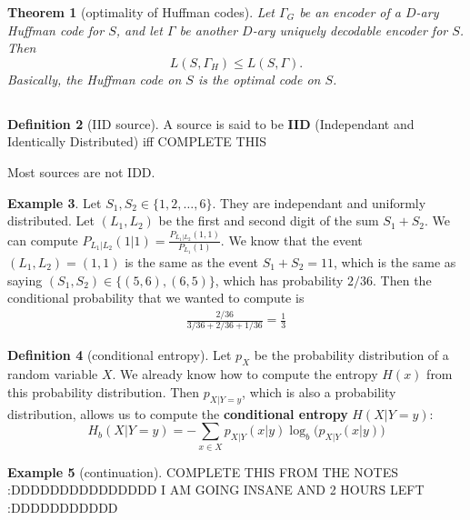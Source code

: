 \documentclass{report}
\theoremstyle{plain}
\newtheorem{thm}{Theorem}
\theoremstyle{definition}
\newtheorem{exmp}[thm]{Example}
\newtheorem{defn}[thm]{Definition}
\theoremstyle{remark}
\begin{document}
\begin{thm}[optimality of Huffman codes]
	Let $\Gamma_G$ be an encoder of a $D$-ary Huffman code for $S$, and let $\Gamma$ be another $D$-ary uniquely decodable encoder for $S$. Then
	\begin{equation}
		L(S, \Gamma_H) \leq L(S, \Gamma).
	\end{equation}
	Basically, the Huffman code on $S$ is the optimal code on $S$.
\end{thm}


\subsection{}

\begin{defn}[IID source]
	A source is said to be \textbf{IID} (Independant and Identically Distributed) iff COMPLETE THIS
\end{defn}
Most sources are not IDD.

\begin{exmp}
	Let $S_1, S_2 \in \{1, 2, \ldots, 6\}$. They are independant and uniformly distributed. Let $(L_1, L_2)$ be the first and second digit of the sum $S_1 + S_2$. We can compute $P_{L_1 | L_2} (1|1) = \frac{P_{L_1 | L_2}(1, 1)}{P_{L_1}(1)}$. We know that the event $(L_1, L_2) = (1, 1)$ is the same as the event $S_1 + S_2 = 11$, which is the same as saying $(S_1, S_2) \in \{(5, 6), (6, 5)\}$, which has probability $2/36$. Then the conditional probability that we wanted to compute is
	\begin{align*}
		\frac{2/36}{3/36 + 2/36 + 1/36} = \frac13
	\end{align*}
\end{exmp}

\begin{defn}[conditional entropy]
	Let $p_X$ be the probability distribution of a random variable $X$. We already know how to compute the entropy $H(x)$ from this probability distribution. Then $p_{X|Y=y}$, which is also a probability distribution, allows us to compute the \textbf{conditional entropy} $H(X|Y=y)$:
	\begin{equation}
		H_b(X|Y=y) = - \sum_{x \in X} p_{X|Y}(x|y) \log_b \bigl(p_{X|Y}(x|y)\bigr)
	\end{equation} 	
\end{defn}

\begin{exmp}[continuation]
COMPLETE THIS FROM THE NOTES :DDDDDDDDDDDDDDD I AM GOING INSANE AND 2 HOURS LEFT :DDDDDDDDDDD
\end{exmp}
\end{document}
